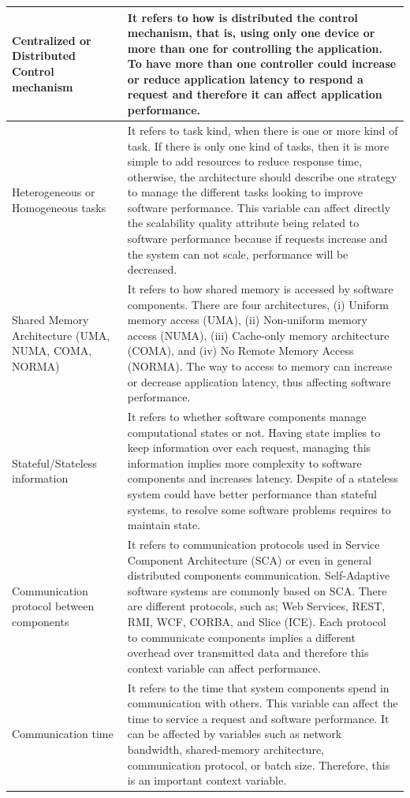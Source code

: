 {\begin{longtable}{|p{1.7in}|p{4.5in}|}
		Centralized or Distributed Control mechanism        &                     
		It refers to how is distributed the control mechanism, that is, using only one device or more than one for controlling the application. To have more than one controller could increase or reduce application latency to respond a request and therefore it can affect application performance.           \\ \hline
		Heterogeneous or Homogeneous tasks                  &                     
		It refers to task kind, when there is one or more kind of task. If there is only one kind of tasks, then it is more simple to add resources to reduce response time, otherwise, the architecture should describe one strategy to manage the different tasks looking to improve software performance. This variable can affect directly the scalability quality attribute being related to software performance because if requests  increase and the system can not scale, performance will be decreased.        \\ \hline
		Shared Memory Architecture (UMA, NUMA, COMA, NORMA) &                     
		It refers to how shared memory is accessed by software components. There are four architectures, (i) Uniform memory access (UMA), (ii) Non-uniform memory access (NUMA), (iii) Cache-only memory architecture (COMA), and (iv) No Remote Memory Access (NORMA). The way to access to memory can increase or decrease application latency, thus affecting software performance.           \\ \hline
		Stateful/Stateless information                                &                     
		It refers to whether software components manage computational states or not. Having state implies to keep information over each request, managing this information implies more complexity to software components and increases latency. Despite of a stateless system could have better performance than stateful systems, to resolve some software problems requires to maintain state.           \\ \hline
		Communication protocol between components           &                     
		It refers to communication protocols used in Service Component Architecture (SCA) or even in general distributed components communication. Self-Adaptive software systems are commonly based on SCA. There are different protocols, such as; Web Services, REST, RMI, WCF, CORBA, and Slice (ICE). Each protocol to communicate components implies a different overhead over transmitted data and therefore this context variable can affect performance.            \\ \hline
		Communication time                                  &                     
		It refers to the time that system components spend in communication with others. This variable can affect the time to service a request and software performance. It can be affected by variables such as network bandwidth, shared-memory architecture, communication protocol, or batch size. Therefore, this is an important context variable.          \\ \hline
	\end{longtable}
}


